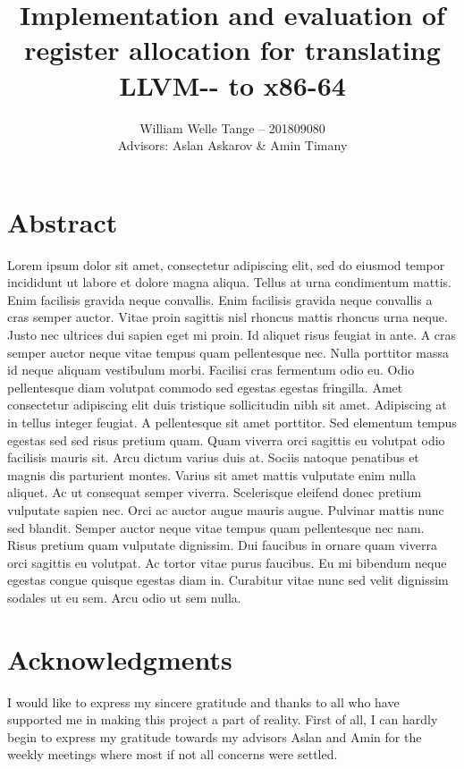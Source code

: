 \documentclass{article}
\title{\myfont Implementation and evaluation of register allocation for translating LLVM-{}- to x86-64}
\author{William Welle Tange -- 201809080\\
  Advisors: Aslan Askarov \& Amin Timany
}
\begin{document}
\maketitle
\begin{center}

\end{center}
\newpage


\section*{Abstract}
Lorem ipsum dolor sit amet, consectetur adipiscing elit, sed do eiusmod tempor incididunt ut labore et dolore magna aliqua. Tellus at urna condimentum mattis. Enim facilisis gravida neque convallis. Enim facilisis gravida neque convallis a cras semper auctor. Vitae proin sagittis nisl rhoncus mattis rhoncus urna neque. Justo nec ultrices dui sapien eget mi proin. Id aliquet risus feugiat in ante. A cras semper auctor neque vitae tempus quam pellentesque nec. Nulla porttitor massa id neque aliquam vestibulum morbi. Facilisi cras fermentum odio eu. Odio pellentesque diam volutpat commodo sed egestas egestas fringilla. Amet consectetur adipiscing elit duis tristique sollicitudin nibh sit amet. Adipiscing at in tellus integer feugiat. A pellentesque sit amet porttitor. Sed elementum tempus egestas sed sed risus pretium quam. Quam viverra orci sagittis eu volutpat odio facilisis mauris sit. Arcu dictum varius duis at. Sociis natoque penatibus et magnis dis parturient montes. Varius sit amet mattis vulputate enim nulla aliquet. Ac ut consequat semper viverra. Scelerisque eleifend donec pretium vulputate sapien nec. Orci ac auctor augue mauris augue. Pulvinar mattis nunc sed blandit. Semper auctor neque vitae tempus quam pellentesque nec nam. Risus pretium quam vulputate dignissim. Dui faucibus in ornare quam viverra orci sagittis eu volutpat. Ac tortor vitae purus faucibus. Eu mi bibendum neque egestas congue quisque egestas diam in. Curabitur vitae nunc sed velit dignissim sodales ut eu sem. Arcu odio ut sem nulla.

\section*{Acknowledgments}
I would like to express my sincere gratitude and thanks to all who have supported me in making this project a part of reality.
First of all, I can hardly begin to express my gratitude towards my advisors Aslan and Amin for the weekly meetings where most if not all concerns were settled.
\newpage
\end{document}
